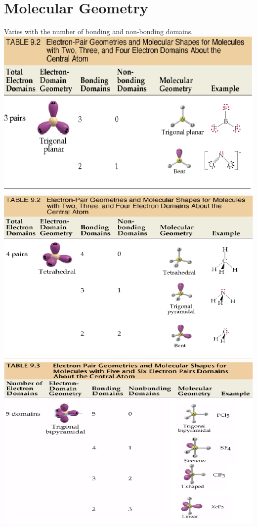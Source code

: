\documentclass[a4paper, 8pt]{memoir}
\begin{document}
\section{Molecular Geometry}
Varies with the number of bonding and non-bonding domains. \\
\includegraphics[scale=0.4]{molgeo3} \\
\includegraphics[scale=0.4]{molgeo4} \\
\includegraphics[scale=0.4]{molgeo5} \\
\end{document}

